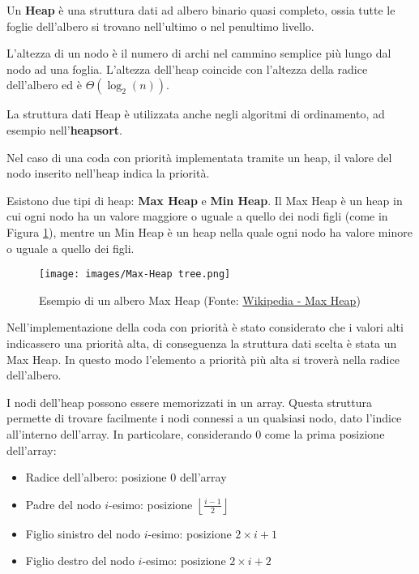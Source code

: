 \documentclass{article}
\begin{document}
Un \textbf{Heap} è una struttura dati ad albero binario quasi completo, ossia tutte le foglie dell'albero si trovano nell'ultimo o nel penultimo livello.

\vspace{5pt}
L'altezza di un nodo è il numero di archi nel cammino semplice più lungo dal nodo ad una foglia. L'altezza dell'heap coincide con l'altezza della radice dell'albero ed è $\Theta(\log_2(n))$.

La struttura dati Heap è utilizzata anche negli algoritmi di ordinamento, ad esempio nell'\textbf{heapsort}.

\vspace{5pt}
Nel caso di una coda con priorità implementata tramite un heap, il valore del nodo inserito nell'heap indica la priorità.

\vspace{5pt}
Esistono due tipi di heap: \textbf{Max Heap} e \textbf{Min Heap}.
Il Max Heap è un heap in cui ogni nodo ha un valore maggiore o uguale a quello dei nodi figli (come in Figura \ref{fig:max_heap_tree}), mentre un Min Heap è un heap nella quale ogni nodo ha valore minore o uguale a quello dei figli.

\begin{figure}[h]
    \texttt{[image: images/Max-Heap tree.png]}
    \centering
    \caption{Esempio di un albero Max Heap (Fonte: \href{https://en.wikipedia.org/wiki/Heap_(data_structure)}{Wikipedia - Max Heap})}
    \label{fig:max_heap_tree}
\end{figure}

Nell'implementazione della coda con priorità è stato considerato che i valori alti indicassero una priorità alta, di conseguenza la struttura dati scelta è stata un Max Heap. In questo modo l'elemento a priorità più alta si troverà nella radice dell'albero.

\vspace{5pt}
I nodi dell'heap possono essere memorizzati in un array. Questa struttura permette di trovare facilmente i nodi connessi a un qualsiasi nodo, dato l'indice all'interno dell'array.
In particolare, considerando 0 come la prima posizione dell'array:
\begin{itemize}
    \item Radice dell'albero: posizione $0$ dell'array
    
    \item Padre del nodo $i$-esimo: posizione $\left \lfloor{\frac{i-1}{2}}\right \rfloor$
    
    \item Figlio sinistro del nodo $i$-esimo: posizione $2\times i + 1$
    
    \item Figlio destro del nodo $i$-esimo: posizione $2\times i + 2$
\end{itemize}
\end{document}
